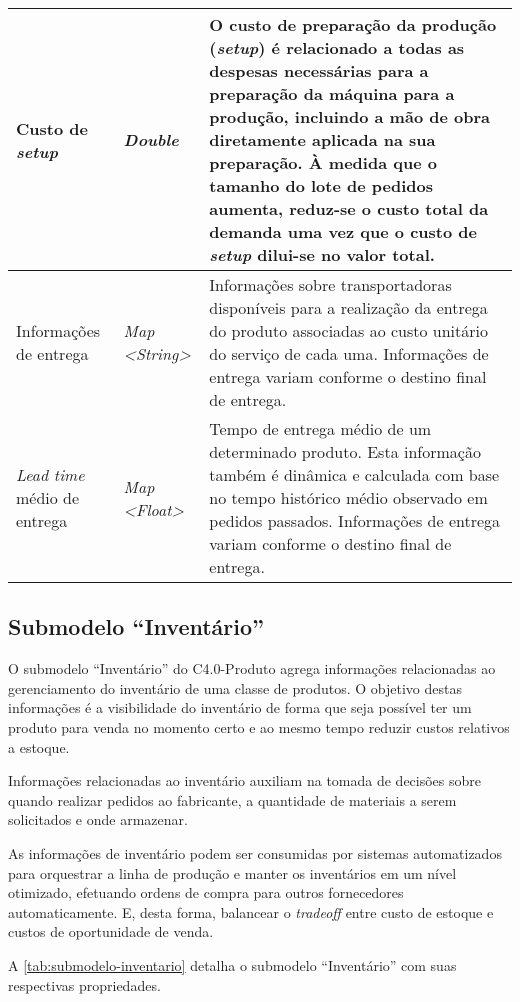\begin{longtable}{|p{}|p{}|p{}|}
	\\ \hline Custo de \textit{setup} & \textit{Double} & O custo de preparação da produção (\textit{setup}) é relacionado a todas as despesas necessárias para a preparação da máquina para a produção, incluindo a mão de obra diretamente aplicada na sua preparação. À medida que o tamanho do lote de pedidos aumenta, reduz-se o custo total da demanda uma vez que o custo de \textit{setup} dilui-se no valor total.

	\\ \hline Informações de entrega & \textit{Map <String>} & Informações sobre transportadoras disponíveis para a realização da entrega do produto associadas ao custo unitário do serviço de cada uma. Informações de entrega variam conforme o destino final de entrega.

	\\ \hline \textit{Lead time} médio de entrega & \textit{Map <Float>} & Tempo de entrega médio de um determinado produto. Esta informação também é dinâmica e calculada com base no tempo histórico médio observado em pedidos passados. Informações de entrega variam conforme o destino final de entrega.

	\\ \hline
\end{longtable}

\subsection{Submodelo ``Inventário''}

O submodelo ``Inventário'' do C4.0-Produto agrega informações relacionadas ao gerenciamento do inventário de uma classe de produtos. O objetivo destas informações é a visibilidade do inventário de forma que seja possível ter um produto para venda no momento certo e ao mesmo tempo reduzir custos relativos a estoque.

Informações relacionadas ao inventário auxiliam na tomada de decisões sobre quando realizar pedidos ao fabricante, a quantidade de materiais a serem solicitados e onde armazenar.

As informações de inventário podem ser consumidas por sistemas automatizados para orquestrar a linha de produção e manter os inventários em um nível otimizado, efetuando ordens de compra para outros fornecedores automaticamente. E, desta forma, balancear o \textit{tradeoff} entre custo de estoque e custos de oportunidade de venda.

A \autoref{tab:submodelo-inventario} detalha o submodelo ``Inventário'' com suas respectivas propriedades.

